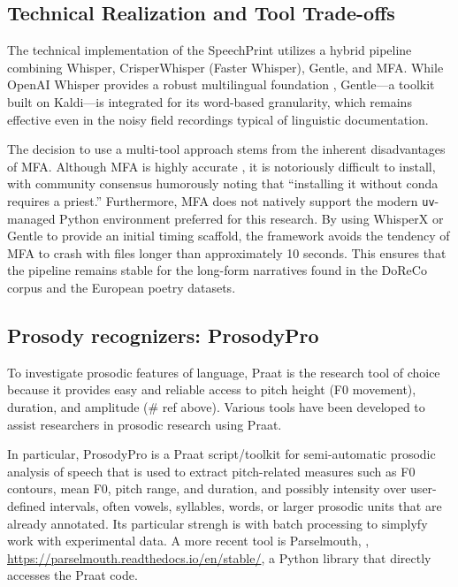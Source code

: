 \subsection{Technical Realization and Tool Trade-offs}

The technical implementation of the SpeechPrint utilizes a hybrid pipeline combining Whisper, CrisperWhisper (Faster Whisper), Gentle, and MFA. While OpenAI Whisper provides a robust multilingual foundation \cite{radford2023whisper}, Gentle---a toolkit built on Kaldi---is integrated for its word-based granularity, which remains effective even in the noisy field recordings typical of linguistic documentation.

The decision to use a multi-tool approach stems from the inherent disadvantages of MFA. Although MFA is highly accurate \cite{mcauliffe2017mfa}, it is notoriously difficult to install, with community consensus humorously noting that ``installing it without conda requires a priest.'' Furthermore, MFA does not natively support the modern \texttt{uv}-managed Python environment preferred for this research. By using WhisperX \cite{bain2023whisperx} or Gentle to provide an initial timing scaffold, the framework avoids the tendency of MFA to crash with files longer than approximately 10 seconds. This ensures that the pipeline remains stable for the long-form narratives found in the DoReCo corpus and the European poetry datasets.

\subsection{Prosody recognizers: ProsodyPro}

To investigate prosodic features of language, Praat is the research tool of choice because it provides easy and reliable access to pitch height (F0 movement), duration, and amplitude (# ref above). Various tools have been developed to assist researchers in prosodic research using Praat. 

In particular, ProsodyPro \cite{xi2013} is a Praat script/toolkit for semi-automatic prosodic analysis of speech that is used to extract pitch-related measures such as F0 contours, mean F0, pitch range, and duration, and possibly intensity over user-defined intervals, often vowels, syllables, words, or larger prosodic units that are already annotated. Its particular strengh is with batch processing to simplyfy work with experimental data. A more recent tool is Parselmouth, \cite{Jadoul2018},  \url{https://parselmouth.readthedocs.io/en/stable/}, a Python library that directly accesses the Praat code. 

